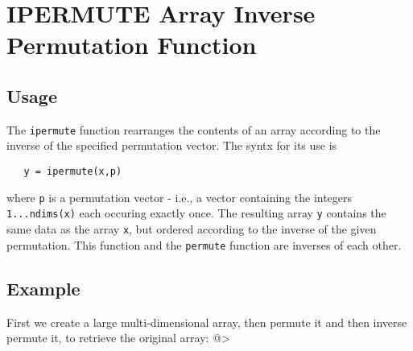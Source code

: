 \section{IPERMUTE Array Inverse Permutation Function}

\subsection{Usage}

The \verb|ipermute| function rearranges the contents of an array according
to the inverse of the specified permutation vector.  The syntx for 
its use is
\begin{verbatim}
   y = ipermute(x,p)
\end{verbatim}
where \verb|p| is a permutation vector - i.e., a vector containing the 
integers \verb|1...ndims(x)| each occuring exactly once.  The resulting
array \verb|y| contains the same data as the array \verb|x|, but ordered
according to the inverse of the given permutation.  This function and
the \verb|permute| function are inverses of each other.
\subsection{Example}

First we create a large multi-dimensional array, then permute it
 and then inverse permute it, to retrieve the original array:
@>
